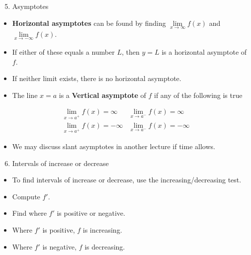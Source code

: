 \begin{frame}[t]
\begin{enumerate}
\setcounter{enumi}{4}
\item  Asymptotes
\end{enumerate}
\begin{itemize}
\item  \textbf{Horizontal asymptotes} can be found by finding $\lim\limits_{x\to\infty} f(x)$ and $\lim\limits_{x\to -\infty} f(x)$.
\item  If either of these equals a number $L$, then $y = L$ is a horizontal asymptote of $f$.
\item  If neither limit exists, there is no horizontal asymptote.
\item  The line $x = a$ is a \textbf{Vertical asymptote} of $f$ if any of the following is true
\end{itemize}
\[
\begin{array}{ll}
\displaystyle \lim_{x\to a^+}f(x) = \infty &%
\displaystyle \lim_{x\to a^-}f(x) = \infty \\%
\displaystyle \lim_{x\to a^+}f(x) = -\infty &%
\displaystyle \lim_{x\to a^-}f(x) = -\infty %
\end{array}
\]
\begin{itemize}
\item  We may discuss slant asymptotes in another lecture if time allows.
\end{itemize}
\end{frame}


\begin{frame}[t]
\begin{enumerate}
\setcounter{enumi}{5}
\item  Intervals of increase or decrease
\end{enumerate}
\begin{itemize}
\item  To find intervals of increase or decrease, use the increasing/decreasing test.
\item  Compute $f'$.
\item  Find where $f'$ is positive or negative.
\item  Where $f'$ is positive, $f$ is increasing.
\item  Where $f'$ is negative, $f$ is decreasing.
\end{itemize}
\end{frame}




